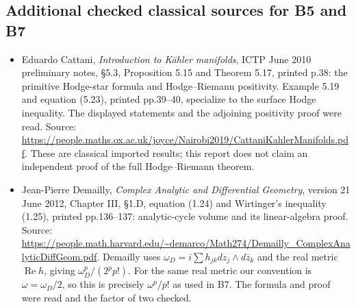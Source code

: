 \subsection{Additional checked classical sources for B5 and B7}\label{additional-checked-classical-sources-for-b5-and-b7}

\begin{itemize}
\tightlist
\item
  Eduardo Cattani, \emph{Introduction to Kähler manifolds}, ICTP June 2010 preliminary notes, §5.3, Proposition 5.15 and Theorem 5.17, printed p.38: the primitive Hodge-star formula and Hodge--Riemann positivity. Example 5.19 and equation (5.23), printed pp.39--40, specialize to the surface Hodge inequality. The displayed statements and the adjoining positivity proof were read. Source: \url{https://people.maths.ox.ac.uk/joyce/Nairobi2019/CattaniKahlerManifolds.pdf}. These are classical imported results; this report does not claim an independent proof of the full Hodge--Riemann theorem.
\item
  Jean-Pierre Demailly, \emph{Complex Analytic and Differential Geometry}, version 21 June 2012, Chapter III, §1.D, equation (1.24) and Wirtinger's inequality (1.25), printed pp.136--137: analytic-cycle volume and its linear-algebra proof. Source: \url{https://people.math.harvard.edu/~demarco/Math274/Demailly_ComplexAnalyticDiffGeom.pdf}. Demailly uses \(\omega_D=i\sum h_{jk}dz_j\wedge d\bar z_k\) and the real metric \(\operatorname{Re}h\), giving \(\omega_D^p/(2^p p!)\). For the same real metric our convention is \(\omega=\omega_D/2\), so this is precisely \(\omega^p/p!\) as used in B7. The formula and proof were read and the factor of two checked.
\end{itemize}
